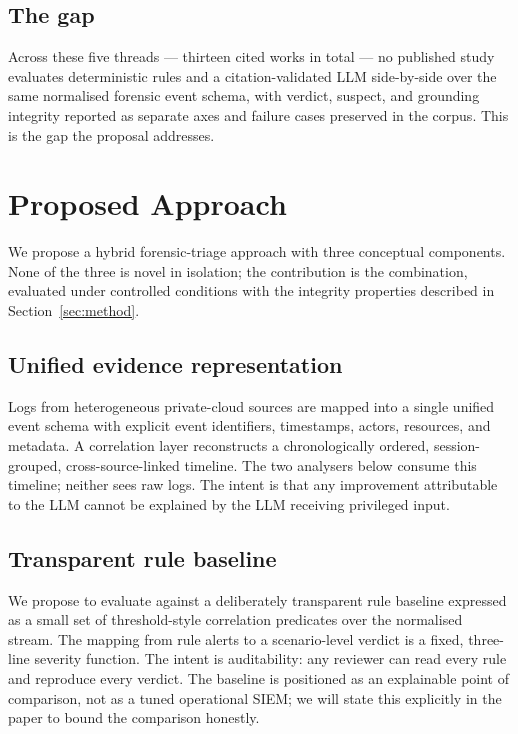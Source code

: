 \documentclass[conference]{IEEEtran}
\begin{document}
\subsection{The gap}
Across these five threads --- thirteen cited works in total --- no published study evaluates deterministic rules and a citation-validated LLM side-by-side over the same normalised forensic event schema, with verdict, suspect, and grounding integrity reported as separate axes and failure cases preserved in the corpus. This is the gap the proposal addresses.

\section{Proposed Approach}
\label{sec:approach}

We propose a hybrid forensic-triage approach with three conceptual components. None of the three is novel in isolation; the contribution is the combination, evaluated under controlled conditions with the integrity properties described in Section~\ref{sec:method}.

\subsection{Unified evidence representation}
Logs from heterogeneous private-cloud sources are mapped into a single unified event schema with explicit event identifiers, timestamps, actors, resources, and metadata. A correlation layer reconstructs a chronologically ordered, session-grouped, cross-source-linked timeline. The two analysers below consume this timeline; neither sees raw logs. The intent is that any improvement attributable to the LLM cannot be explained by the LLM receiving privileged input.

\subsection{Transparent rule baseline}
We propose to evaluate against a deliberately transparent rule baseline expressed as a small set of threshold-style correlation predicates over the normalised stream. The mapping from rule alerts to a scenario-level verdict is a fixed, three-line severity function. The intent is auditability: any reviewer can read every rule and reproduce every verdict. The baseline is positioned as an explainable point of comparison, not as a tuned operational SIEM; we will state this explicitly in the paper to bound the comparison honestly.
\end{document}
